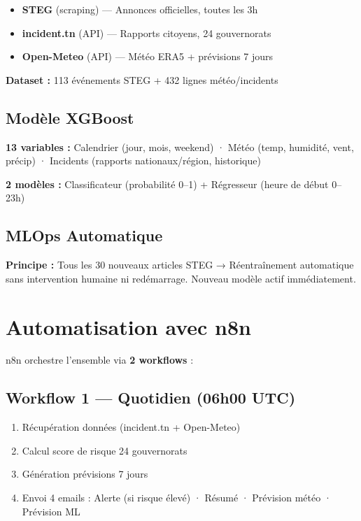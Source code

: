 \documentclass[10pt,a4paper]{article}
\begin{document}
\begin{itemize}
\item \textbf{STEG} (scraping) — Annonces officielles, toutes les 3h
\item \textbf{incident.tn} (API) — Rapports citoyens, 24 gouvernorats
\item \textbf{Open-Meteo} (API) — Météo ERA5 + prévisions 7 jours
\end{itemize}

\textbf{Dataset :} 113 événements STEG + 432 lignes météo/incidents

\subsection*{Modèle XGBoost}

\textbf{13 variables :} Calendrier (jour, mois, weekend) · Météo (temp, humidité, vent, précip) · Incidents (rapports nationaux/région, historique)

\textbf{2 modèles :} Classificateur (probabilité 0–1) + Régresseur (heure de début 0–23h)

\subsection*{MLOps Automatique}

\textbf{Principe :} Tous les 30 nouveaux articles STEG → Réentraînement automatique sans intervention humaine ni redémarrage. Nouveau modèle actif immédiatement.

\section{Automatisation avec n8n}
\vspace{-2pt}

n8n orchestre l'ensemble via \textbf{2 workflows} :

\subsection*{Workflow 1 — Quotidien (06h00 UTC)}

\begin{enumerate}
\item Récupération données (incident.tn + Open-Meteo)
\item Calcul score de risque 24 gouvernorats
\item Génération prévisions 7 jours
\item Envoi 4 emails : Alerte (si risque élevé) · Résumé · Prévision météo · Prévision ML
\end{enumerate}
\end{document}
